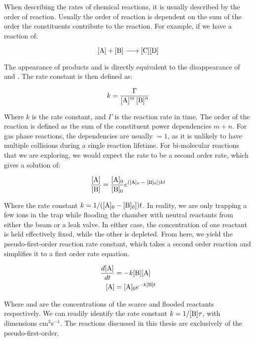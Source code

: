 When describing the rates of chemical reactions, it is usually described by the order of reaction. Usually the order of reaction is dependent on the sum of the order the constituents contribute to the reaction. For example, if we have a reaction of:

\begin{equation*}
	\ce{[A] + [B] -> [C][D]}
\end{equation*}

The appearance of products \ce{[C]} and \ce{[D]} is directly equivalent to the disappearance of \ce{[A]} and \ce{[B]}. The rate constant is then defined as:

\begin{equation*}
	k = \frac{\Gamma}{\ce{[A]^m [B]^n}}
\end{equation*}

Where $k$ is the rate constant, and $\Gamma$ is the reaction rate in time. The order of the reaction is defined as the sum of the constituent power dependencies $m+n$. For gas phase reactions, the dependencies are usually $=1$, as it is unlikely to have multiple collisions during a single reaction lifetime. For bi-molecular reactions that we are exploring, we would expect the rate to be a second order rate, which gives a solution of:

\begin{equation*}
	\frac{\ce{[A]}}{\ce{[B]}} = \frac{\ce{[A]0}}{\ce{[B]0}}e^{(\ce{[A]0 - [B]0}])kt}
\end{equation*}

Where the rate constant $k=1/(\ce{[A]0 - [B]0}])t$. In reality, we are only trapping a few ions in the trap while flooding the chamber with neutral reactants from either the beam or a leak valve. In either case, the concentration of one reactant is held effectively fixed, while the other is depleted. From here, we yield the pseudo-first-order reaction rate constant, which takes a second order reaction and simplifies it to a first order rate equation.

\begin{align}
	\frac{d\ce{[A]}}{dt} & = - k \ce{[B]} \ce{[A]} \nonumber \\
	\ce{[A]} & = \ce{[A]_0}e^{-k\ce{[B]}t}
\end{align}

Where \ce{[A]} and \ce{[B]} are the concentrations of the scarce and flooded reactants respectively. We can readily identify the rate constant $k=1/\ce{[B]}\tau$, with dimensions cm$^3$s$^{-1}$. The reactions discussed in this thesis are exclusively of the pseudo-first-order.